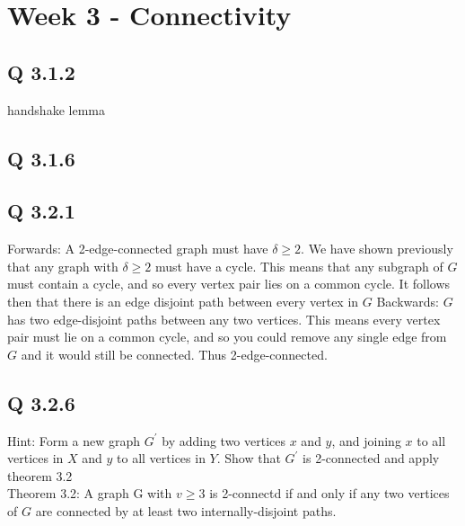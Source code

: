 

\chapter[Week 3 - Connectivity]{Week 3 - Connectivity}

\section{Q 3.1.2}
handshake lemma

\section{Q 3.1.6}

\section{Q 3.2.1}
Forwards: A 2-edge-connected graph must have $\delta \geq 2$. We have shown previously that any graph with $\delta \geq 2$ must have a cycle. This means that any subgraph of $G$ must contain a cycle, and so every vertex pair lies on a common cycle. It follows then that there is an edge disjoint path between every vertex in $G$
Backwards: $G$ has two edge-disjoint paths between any two vertices. This means every vertex pair must lie on a common cycle, and so you could remove any single edge from $G$ and it would still be connected. Thus 2-edge-connected.

\section{Q 3.2.6}
Hint: Form a new graph $G^\prime$ by adding two vertices $x$ and $y$, and joining $x$ to all vertices in $X$ and $y$ to all vertices in $Y$. Show that $G^\prime$ is 2-connected and apply theorem 3.2\\
Theorem 3.2: A graph G with $v \geq 3$ is 2-connectd if and only if any two vertices of $G$ are connected by at least two internally-disjoint paths.\\

